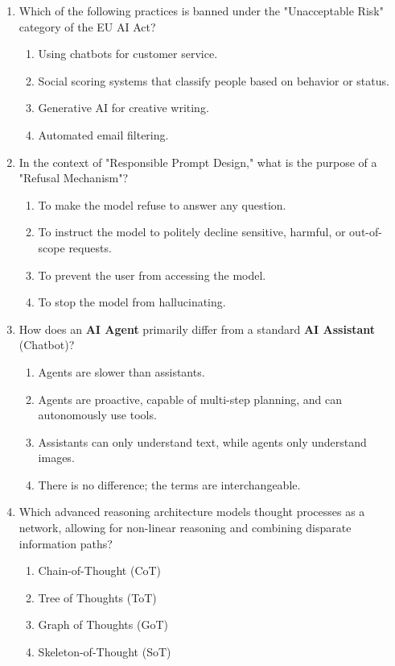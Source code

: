 \documentclass[11pt,a4paper]{article}
\begin{document}
\begin{enumerate}[leftmargin=*, label=\textbf{\#\arabic*}]
  \item Which of the following practices is banned under the "Unacceptable Risk" category of the EU AI Act?
    \begin{enumerate}[label=\Alph*)]
      \item Using chatbots for customer service.
      \item Social scoring systems that classify people based on behavior or status.
      \item Generative AI for creative writing.
      \item Automated email filtering.
    \end{enumerate}

  \item In the context of "Responsible Prompt Design," what is the purpose of a "Refusal Mechanism"?
    \begin{enumerate}[label=\Alph*)]
      \item To make the model refuse to answer any question.
      \item To instruct the model to politely decline sensitive, harmful, or out-of-scope requests.
      \item To prevent the user from accessing the model.
      \item To stop the model from hallucinating.
    \end{enumerate}

  \item How does an \textbf{AI Agent} primarily differ from a standard \textbf{AI Assistant} (Chatbot)?
    \begin{enumerate}[label=\Alph*)]
      \item Agents are slower than assistants.
      \item Agents are proactive, capable of multi-step planning, and can autonomously use tools.
      \item Assistants can only understand text, while agents only understand images.
      \item There is no difference; the terms are interchangeable.
    \end{enumerate}

  \item Which advanced reasoning architecture models thought processes as a network, allowing for non-linear reasoning and combining disparate information paths?
    \begin{enumerate}[label=\Alph*)]
      \item Chain-of-Thought (CoT)
      \item Tree of Thoughts (ToT)
      \item Graph of Thoughts (GoT)
      \item Skeleton-of-Thought (SoT)
    \end{enumerate}


\end{enumerate}
\end{document}
